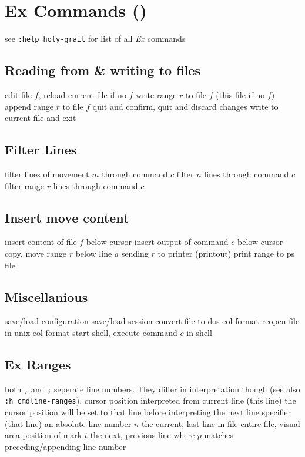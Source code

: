 \vskip -0.2cm
\section{Ex Commands (\enter)}	{see {\tt :help holy-grail} for list of all {\it Ex\/} commands}
\subsection{Reading from \& writing to files}	{}
	{edit file $f$, reload current file if no $f$}
	{write range $r$ to file $f$ (this file if no $f$)}
	{append range $r$ to file $f$}
	{quit and confirm, quit and discard changes}
	{write to current file and exit}

\subsection{Filter Lines}{}
	{filter lines of movement $m$ through command $c$}
	{filter $n$ lines through command $c$}
	{filter range $r$ lines through command $c$}

\subsection{Insert \or move content}	{}
	{insert content of file $f$ below cursor}
	{insert output of command $c$ below cursor}
	{copy, move range $r$ below line $a$}
	{sending $r$ to printer (printout)}
	{print range to ps file}

\subsection{Miscellanious}	{}
	{save/load configuration}
	{save/load session}
	{convert file to dos eol format}
	{reopen file in unix eol format}
	{start shell, execute command $c$ in shell}

\vskip -0.2cm
\subsection{Ex Ranges}	{both {\tt ,} and {\tt ;} seperate line numbers. They differ in interpretation though (see also {\tt :h cmdline-ranges}).}
\cmdOper{, }	{cursor position interpreted from current line (this line)}
\cmdOper{;\ }	{the cursor position will be set to that line before interpreting the next line specifier (that line)}
	{an absolute line number $n$}
	{the current, last line in file}
\cmdOper{\% * }	{entire file, visual area}
	{position of mark $t$}
	{the next, previous line where $p$ matches}
	{preceding/appending line number}

